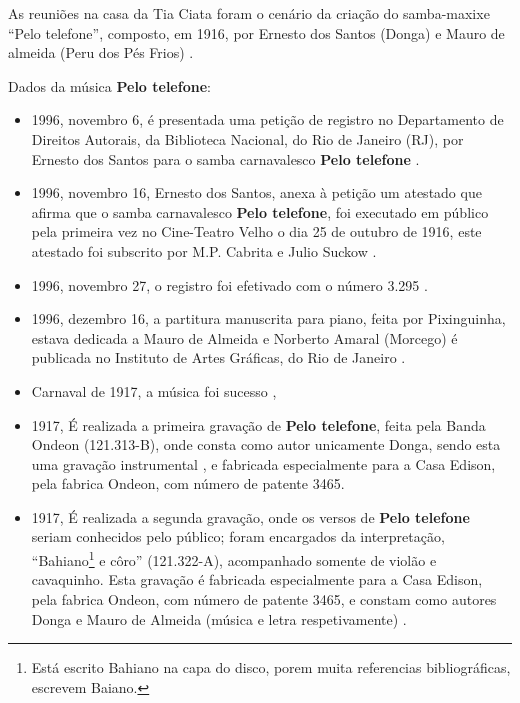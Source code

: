  As reuniões na casa da Tia Ciata foram o cenário da criação do samba-maxixe ``Pelo telefone'',
 composto, em 1916, 
por Ernesto dos Santos (Donga) e Mauro de almeida (Peru dos Pés Frios) \cite[pp. 34]{diniz2006almanaque} \cite[pp. 49]{diniz2008almanaque} \cite{musicapelotelefone} \cite[pp. 28]{diniz2003almanaque}.
\begin{remarcar}
Dados da música \textbf{Pelo telefone}:
\begin{itemize}
\item 1996, novembro 6, é presentada uma petição de registro no
Departamento de Direitos Autorais, da Biblioteca Nacional, 
do Rio de Janeiro (RJ), 
por   Ernesto dos Santos  para o samba carnavalesco \textbf{Pelo telefone} \cite[pp. 599]{marcondes1977enciclopediav2}.
\item 1996, novembro 16, Ernesto dos Santos, 
anexa à petição um atestado que afirma que 
o samba carnavalesco \textbf{Pelo telefone}, 
foi executado em público pela primeira vez no
Cine-Teatro Velho o dia 25 de outubro de 1916,
este atestado foi subscrito por M.P. Cabrita e Julio Suckow \cite[pp. 599]{marcondes1977enciclopediav2}.
\item 1996, novembro 27, o registro foi efetivado com o número 3.295 \cite[pp. 599]{marcondes1977enciclopediav2}.
\item 1996, dezembro 16, a partitura manuscrita para piano, feita por Pixinguinha, 
estava dedicada a Mauro de Almeida e Norberto Amaral (Morcego) é
publicada no Instituto de Artes Gráficas, do Rio de Janeiro \cite[pp. 599]{marcondes1977enciclopediav2}.
\item Carnaval de 1917, a música foi sucesso   \cite[pp. 599]{marcondes1977enciclopediav2}  \cite[pp. 35]{diniz2006almanaque}, 

\item 1917, É realizada a primeira gravação de  \textbf{Pelo telefone}, feita pela Banda Ondeon (121.313-B), 
onde consta como autor unicamente Donga, 
sendo esta uma gravação instrumental \cite{musicapelotelefone} \cite[pp. 599]{marcondes1977enciclopediav2},
e  fabricada especialmente para a Casa Edison, pela fabrica Ondeon, com número de patente 3465.
\item 1917, É realizada a segunda gravação, onde os versos de \textbf{Pelo telefone} seriam conhecidos pelo público;
foram encargados da interpretação, ``Bahiano\footnote{Está 
escrito Bahiano na capa do disco, porem muita referencias bibliográficas,
escrevem Baiano.} e côro'' (121.322-A), acompanhado somente de violão e cavaquinho. 
Esta gravação é fabricada especialmente para a Casa Edison, pela fabrica Ondeon, com número de patente 3465,  
e constam como autores Donga e Mauro de Almeida 
(música e letra respetivamente) \cite[pp. 599]{marcondes1977enciclopediav2} 
\cite[pp. 35]{diniz2006almanaque}  \cite{musicapelotelefone}.
\end{itemize}
\end{remarcar}

